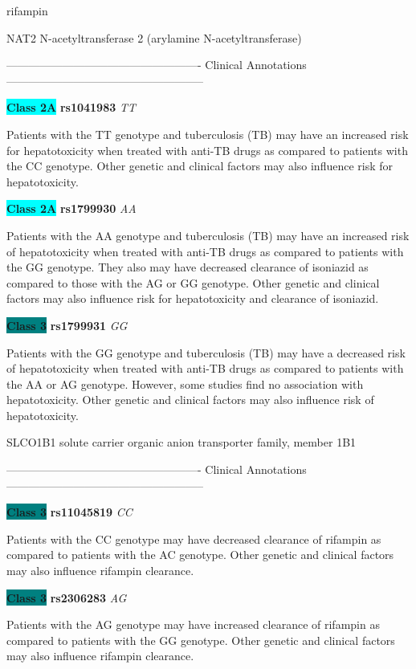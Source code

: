 \documentclass{resume} %
\begin{document}
\begin{rSection}{ rifampin }
\begin{rSubsection}{ NAT2 }{ N-acetyltransferase 2 (arylamine N-acetyltransferase) }{}{}
\item[] ---------------------------------------------------- Clinical Annotations -----------------------------------------------------\newline
\item \textbf{\colorbox{cyan} {Class 2A}} \textbf{ rs1041983 } \textit{ TT }
\item[] Patients with the TT genotype and tuberculosis (TB) may have an increased risk for hepatotoxicity when treated with anti-TB drugs as compared to patients with the CC genotype. Other genetic and clinical factors may also influence risk for hepatotoxicity.\item \textbf{\colorbox{cyan} {Class 2A}} \textbf{ rs1799930 } \textit{ AA }
\item[] Patients with the AA genotype and tuberculosis (TB) may have an increased risk of hepatotoxicity when treated with anti-TB drugs as compared to patients with the GG genotype. They also may have decreased clearance of isoniazid as compared to those with the AG or GG genotype. Other genetic and clinical factors may also influence risk for hepatotoxicity and clearance of isoniazid.\item \textbf{\colorbox{teal} {Class 3}} \textbf{ rs1799931 } \textit{ GG }
\item[] Patients with the GG genotype and tuberculosis (TB) may have a decreased risk of hepatotoxicity when treated with anti-TB drugs as compared to patients with the AA or AG genotype. However, some studies find no association with hepatotoxicity. Other genetic and clinical factors may also influence risk of hepatotoxicity.
\end{rSubsection}\begin{rSubsection}{ SLCO1B1 }{ solute carrier organic anion transporter family, member 1B1 }{}{}
\item[]

\item[] ---------------------------------------------------- Clinical Annotations -----------------------------------------------------\newline
\item \textbf{\colorbox{teal} {Class 3}} \textbf{ rs11045819 } \textit{ CC }
\item[] Patients with the CC genotype may have decreased clearance of rifampin as compared to patients with the AC genotype. Other genetic and clinical factors may also influence rifampin clearance. \item \textbf{\colorbox{teal} {Class 3}} \textbf{ rs2306283 } \textit{ AG }
\item[] Patients with the AG genotype may have increased clearance of rifampin as compared to patients with the GG genotype. Other genetic and clinical factors may also influence rifampin clearance. 
\end{rSubsection}


\end{rSection}
\end{document}
